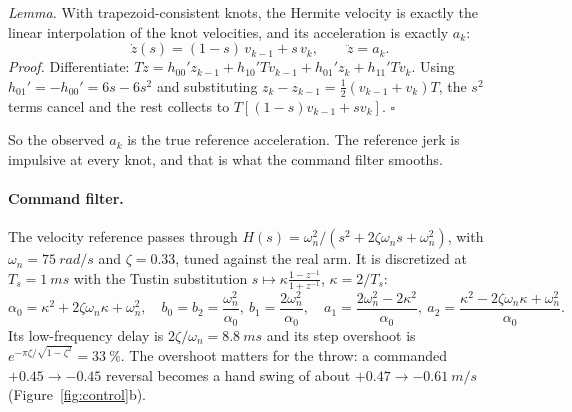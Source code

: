 \documentclass[10.5pt,a4paper]{article}
\begin{document}
\emph{Lemma.} With trapezoid-consistent knots, the Hermite velocity is exactly the linear interpolation of the
knot velocities, and its acceleration is exactly $a_k$:
\begin{equation}
\dot z(s)=(1-s)\,v_{k-1}+s\,v_k,\qquad \ddot z=a_k .
\end{equation}
\emph{Proof.} Differentiate:
$T\dot z=h_{00}'z_{k-1}+h_{10}'Tv_{k-1}+h_{01}'z_k+h_{11}'Tv_k$. Using $h_{01}'=-h_{00}'=6s-6s^2$ and substituting
$z_k-z_{k-1}=\tfrac12(v_{k-1}+v_k)T$, the $s^2$ terms cancel and the rest collects to
$T[(1-s)v_{k-1}+sv_k]$. $\square$

So the observed $a_k$ is the true reference acceleration. The reference jerk is impulsive at every knot, and that
is what the command filter smooths.

\paragraph{Command filter.} The velocity reference passes through
$H(s)=\omega_n^2/(s^2+2\zeta\omega_ns+\omega_n^2)$, with $\omega_n=\SI{75}{rad/s}$ and $\zeta=0.33$, tuned
against the real arm. It is discretized at $T_s=\SI{1}{ms}$ with the Tustin substitution
$s\mapsto\kappa\frac{1-z^{-1}}{1+z^{-1}}$, $\kappa=2/T_s$:
\begin{equation}
\alpha_0=\kappa^2+2\zeta\omega_n\kappa+\omega_n^2,\quad
b_0=b_2=\frac{\omega_n^2}{\alpha_0},\ b_1=\frac{2\omega_n^2}{\alpha_0},\quad
a_1=\frac{2\omega_n^2-2\kappa^2}{\alpha_0},\ a_2=\frac{\kappa^2-2\zeta\omega_n\kappa+\omega_n^2}{\alpha_0}.
\end{equation}
Its low-frequency delay is $2\zeta/\omega_n=\SI{8.8}{ms}$ and its step overshoot is
$e^{-\pi\zeta/\sqrt{1-\zeta^2}}=\SI{33}{\%}$. The overshoot matters for the throw: a commanded
$+0.45\to-0.45$ reversal becomes a hand swing of about $+0.47\to\SI{-0.61}{m/s}$ (Figure~\ref{fig:control}b).
\end{document}
